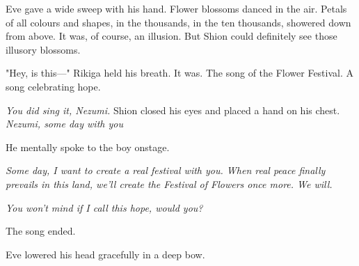 Eve gave a wide sweep with his hand. Flower blossoms danced in the air. Petals of all colours and shapes, in the thousands, in the ten thousands, showered down from above. It was, of course, an illusion. But Shion could definitely see those illusory blossoms.


"Hey, is this---" Rikiga held his breath. It was. The song of the Flower Festival. A song celebrating hope.

\emph{You did sing it, Nezumi.} Shion closed his eyes and placed a hand on his chest. \emph{Nezumi, some day with you\el }

He mentally spoke to the boy onstage.

\emph{Some day, I want to create a real festival with you. When real peace finally prevails in this land, we'll create the Festival of Flowers once more. We will.}

\emph{You won't mind if I call this hope, would you?}

The song ended.

Eve lowered his head gracefully in a deep bow.